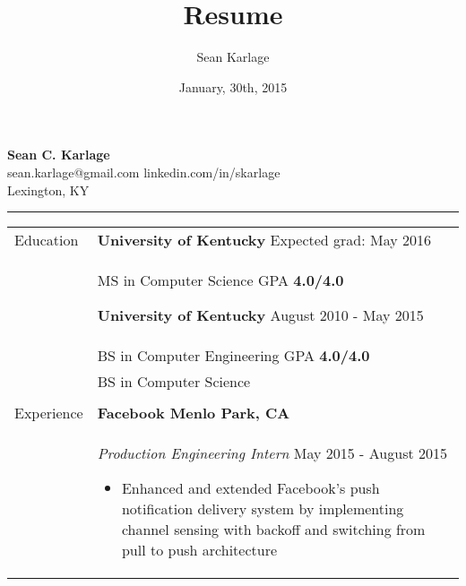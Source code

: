 \documentclass[11pt]{article}
\begin{document}
\title{Resume}            %
\author{Sean Karlage}    %
\date{January, 30th, 2015}    %
\thispagestyle{empty}
\pagestyle{empty}

\begin{center}
    {\LARGE\textbf{Sean C. Karlage}} \\
    sean.karlage@gmail.com \hspace{0.75cm} linkedin.com/in/skarlage \\
    Lexington, KY \vspace{1.0mm}\hrule
\end{center}

\vspace{0.05in}\noindent
\begin{tabular}{p{0.75in} p{5.45in}}

    {Education} &

        \textbf{University of Kentucky} \hfill Expected grad: May 2016 \vspace{0.015in} \\ &
        MS in Computer Science \hfill GPA \textbf{4.0/4.0} \vspace{0.09in}

        \textbf{University of Kentucky} \hfill August 2010 - May 2015 \vspace{0.015in} \\ &
        BS in Computer Engineering \hfill GPA \textbf{4.0/4.0} \vspace{0.015in} \\ &
        BS in Computer Science \\ \\[0.015in]

    {Experience} &
        \textbf{Facebook \hfill Menlo Park, CA} \vspace{0.015in} \\ &
        {\textit{Production Engineering Intern} \hfill May 2015 - August 2015} \vspace{0.02in}
        \begin{itemize}
            \renewcommand{\labelitemi}{$\diamond$}
            \item Enhanced and extended Facebook's push notification delivery system by implementing channel sensing with backoff and switching from pull to push architecture
        \end{itemize} \vspace{0.09in}


\end{tabular}
\end{document}
